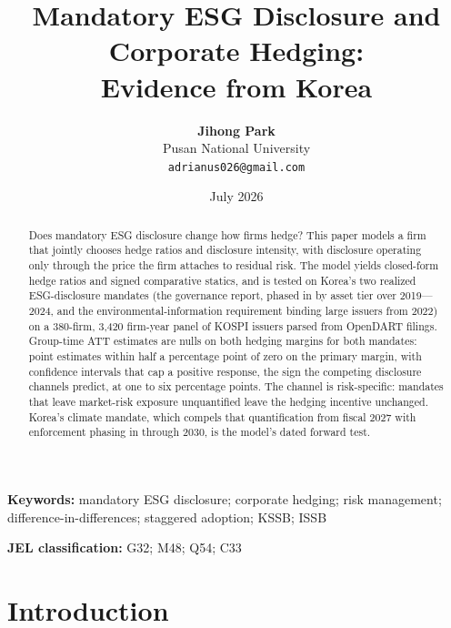\documentclass[11pt,a4paper]{article}
\title{\textbf{Mandatory ESG Disclosure and Corporate Hedging:\\ Evidence from Korea}}
\author{\textbf{Jihong Park} \\ Pusan National University \\ \texttt{adrianus026@gmail.com}}
\date{July 2026}
\begin{document}
\maketitle

\begin{abstract}
Does mandatory ESG disclosure change how firms hedge? This paper models a firm that jointly chooses hedge ratios and disclosure intensity, with disclosure operating only through the price the firm attaches to residual risk. The model yields closed-form hedge ratios and signed comparative statics, and is tested on Korea's two realized ESG-disclosure mandates (the governance report, phased in by asset tier over 2019---2024, and the environmental-information requirement binding large issuers from 2022) on a 380-firm, 3{,}420 firm-year panel of KOSPI issuers parsed from OpenDART filings. Group-time ATT estimates are nulls on both hedging margins for both mandates: point estimates within half a percentage point of zero on the primary margin, with confidence intervals that cap a positive response, the sign the competing disclosure channels predict, at one to six percentage points. The channel is risk-specific: mandates that leave market-risk exposure unquantified leave the hedging incentive unchanged. Korea's climate mandate, which compels that quantification from fiscal 2027 with enforcement phasing in through 2030, is the model's dated forward test.
\end{abstract}

\vspace{0.5em}
\noindent\textbf{Keywords:} mandatory ESG disclosure; corporate hedging; risk management; difference-in-differences; staggered adoption; KSSB; ISSB

\vspace{0.3em}
\noindent\textbf{JEL classification:} G32; M48; Q54; C33

\tableofcontents
\newpage

\section{Introduction}
\label{sec:intro}
\end{document}
